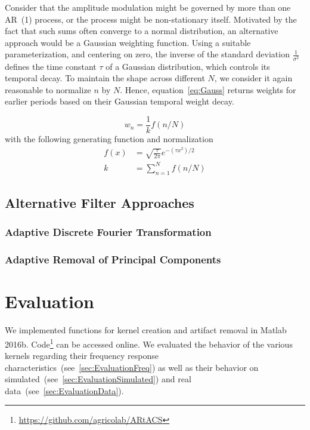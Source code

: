 \documentclass[a4paper]{article}
\begin{document}
Consider that the amplitude modulation might be governed by more than one AR~(1) process, or the process might be non-stationary itself.
Motivated by the fact that such sums  often converge to a normal distribution, an alternative approach would be a Gaussian weighting function.
Using a suitable parameterization, and centering on zero, the inverse of the standard deviation $\frac{1}{\sigma^2}$ defines the time constant $\tau$ of a Gaussian distribution, which controls its temporal decay.
To maintain the shape across different $N$, we consider it again reasonable to normalize $n$ by $N$. Hence, equation~\eqref{eq:Gauss} returns weights for earlier periods based on their Gaussian temporal weight decay.

\begin{equation}
    w_n = \frac{1}{k} f(n/N)\label{eq:Gauss}
\end{equation}
with the following generating function and normalization
\begin{align}
    f(x)  & = \sqrt{\frac{\tau}{2\pi}} e^{-(\tau x^2)/2}  \\
    k  & = \sum_{n=1}^{N} f(n/N)\label{eq:NormGauss}
\end{align}

\subsection{Alternative Filter Approaches}

\subsubsection{Adaptive Discrete Fourier Transformation}

\subsubsection{Adaptive Removal of Principal Components}

\section{Evaluation}

We implemented functions for kernel creation and artifact removal in Matlab 2016b. Code\footnote{\url{https://github.com/agricolab/ARtACS}}  can be accessed online. We evaluated the behavior of the various kernels regarding their frequency response characteristics~(see~\ref{sec:EvaluationFreq}) as well as their behavior on simulated~(see~\ref{sec:EvaluationSimulated})  and real data~(see~\ref{sec:EvaluationData}).
\end{document}
